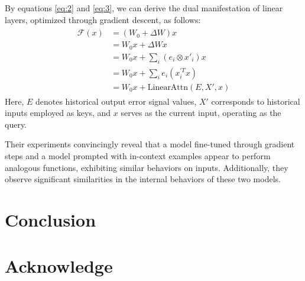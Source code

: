 \documentclass[11pt]{article}
\begin{document}
By equations \eqref{eq:2} and \eqref{eq:3}, we can derive the dual manifestation of linear layers, optimized through gradient descent, as follows:
\begin{align}
	\begin{split}
		\mathcal{F}(x) &= (W_0 + \Delta W)x \\
		&= W_0x + \Delta Wx \\
		&= W_0x + \sum_{i} (e_i \otimes x'_i)x \\
		&= W_0x + \sum_{i} e_i(x^{'T}_ix) \\
		&= W_0x + \text{LinearAttn}(E, X', x)
	\end{split}
	\label{eq:4}
\end{align}
Here, $E$ denotes historical output error signal values, $X'$ corresponds to historical inputs employed as keys, and $x$ serves as the current input, operating as the query.

Their experiments convincingly reveal that a model fine-tuned through gradient steps and a model prompted with in-context examples appear to perform analogous functions, exhibiting similar behaviors on inputs.
Additionally, they observe significant similarities in the internal behaviors of these two models.




\section{Conclusion}

\section{Acknowledge}

\nocite{rw1}
\nocite{rw2}




\newpage
\appendix
\end{document}
